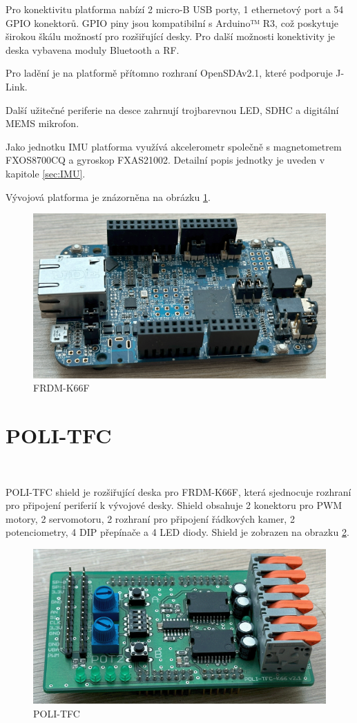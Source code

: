 Pro konektivitu platforma nabízí 2 micro-B USB porty, 1 ethernetový port a 54 GPIO konektorů.
GPIO piny jsou kompatibilní s Arduino™ R3, což poskytuje širokou škálu možností pro rozšiřující desky.
Pro další možnosti konektivity je deska vybavena moduly Bluetooth a RF.

Pro ladění je na platformě přítomno rozhraní OpenSDAv2.1, které podporuje J-Link.

Další užitečné periferie na desce zahrnují trojbarevnou LED, SDHC a digitální MEMS mikrofon.

Jako jednotku IMU platforma využívá akcelerometr společně s magnetometrem FXOS8700CQ
a gyroskop FXAS21002. Detailní popis jednotky je uveden v kapitole \ref{sec:IMU}.\cite{frdmk66UserGuide}

Vývojová platforma je znázorněna na obrázku \ref{fig:FRDM-K66F}.
\begin{figure}[h]
    \centering
    \includegraphics[width=0.45\linewidth]{Figures/FRDM-K66F.png}
    \caption{FRDM-K66F}
    \label{fig:FRDM-K66F}
\end{figure}

\section{POLI-TFC}
\label{sec:POLI-TFC}\

POLI-TFC shield je rozšiřující deska pro FRDM-K66F, která sjednocuje rozhraní pro
připojení periferií k vývojové desky. Shield obsahuje 2 konektoru pro PWM motory, 2 servomotoru,
2 rozhraní pro připojení řádkových kamer, 2 potenciometry, 4 DIP přepínače a 4 LED diody.
Shield je zobrazen na obrazku \ref{fig:POLI-TFC}.
\begin{figure}[h]
    \centering
    \includegraphics[width=0.45\linewidth]{Figures/POLI-TFC.png}
    \caption{POLI-TFC}
    \label{fig:POLI-TFC}
\end{figure}

